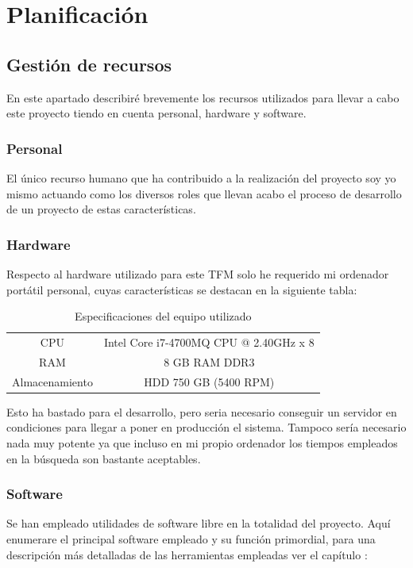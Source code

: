 \chapter{Planificación}

\section{Gestión de recursos}
En este apartado describiré brevemente los recursos utilizados para llevar a cabo este proyecto tiendo en cuenta personal, hardware y software.

\subsection{Personal}
El único recurso humano que ha contribuido a la realización del proyecto soy yo mismo actuando como los diversos roles que llevan acabo el proceso de desarrollo de un proyecto de estas características.

\subsection{Hardware}
Respecto al hardware utilizado para este \acrshort{TFM} solo he requerido mi ordenador portátil personal, cuyas características se destacan en la siguiente tabla:

\begin{table} [h!]
\centering
\begin{tabular}{c c}
	\hline
	     CPU       & Intel \textregistered  Core \texttrademark  i7-4700MQ CPU @ 2.40GHz x 8 \\
	     RAM       & 8 GB RAM DDR3                                                           \\
	Almacenamiento & HDD 750 GB (5400 RPM)                                                   \\ \hline
\end{tabular}
	\caption{Especificaciones del equipo utilizado}
\end{table}

Esto ha bastado para el desarrollo, pero seria necesario conseguir un servidor en condiciones para llegar a poner en producción el sistema. Tampoco sería necesario nada muy potente ya que incluso en mi propio ordenador los tiempos empleados en la búsqueda son bastante aceptables.

\subsection{Software}
Se han empleado utilidades de software libre en la totalidad del proyecto. Aquí enumerare el principal software empleado y su función primordial, para una descripción más detalladas de las herramientas empleadas ver el capítulo :

